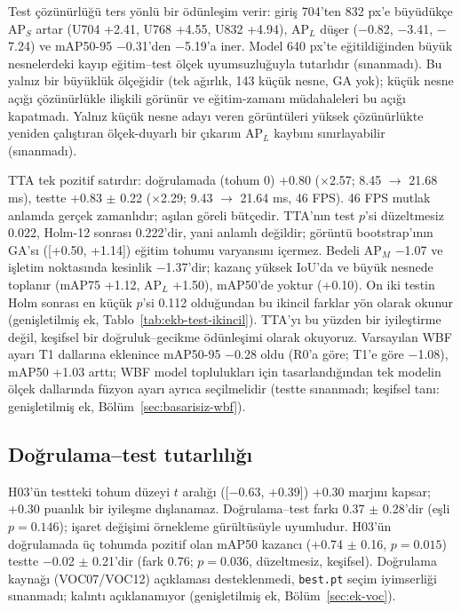 \documentclass[pdflatex,iicol,sn-mathphys-num]{sn-jnl}
\begin{document}
Test çözünürlüğü ters yönlü bir ödünleşim verir: giriş 704'ten 832 px'e büyüdükçe AP$_S$ artar (U704 +2.41, U768 +4.55, U832 +4.94), AP$_L$ düşer ($-$0.82, $-$3.41, $-$7.24) ve mAP50-95 $-$0.31'den $-$5.19'a iner. Model 640 px'te eğitildiğinden büyük nesnelerdeki kayıp eğitim--test ölçek uyumsuzluğuyla tutarlıdır (sınanmadı). Bu yalnız bir büyüklük ölçeğidir (tek ağırlık, 143 küçük nesne, GA yok); küçük nesne açığı çözünürlükle ilişkili görünür ve eğitim-zamanı müdahaleleri bu açığı kapatmadı. Yalnız küçük nesne adayı veren görüntüleri yüksek çözünürlükte yeniden çalıştıran ölçek-duyarlı bir çıkarım AP$_L$ kaybını sınırlayabilir (sınanmadı).

TTA tek pozitif satırdır: doğrulamada (tohum 0) +0.80 ($\times$2.57; 8.45 $\to$ 21.68 ms), testte +0.83 $\pm$ 0.22 ($\times$2.29; 9.43 $\to$ 21.64 ms, 46 FPS). 46 FPS mutlak anlamda gerçek zamanlıdır; aşılan göreli bütçedir. TTA'nın test $p$'si düzeltmesiz 0.022, Holm-12 sonrası 0.222'dir, yani anlamlı değildir; görüntü bootstrap'ının GA'sı ([+0.50, +1.14]) eğitim tohumu varyansını içermez. Bedeli AP$_M$ $-$1.07 ve işletim noktasında kesinlik $-$1.37'dir; kazanç yüksek IoU'da ve büyük nesnede toplanır (mAP75 +1.12, AP$_L$ +1.50), mAP50'de yoktur (+0.10). On iki testin Holm sonrası en küçük $p$'si 0.112 olduğundan bu ikincil farklar yön olarak okunur (genişletilmiş ek, Tablo~\ref{tab:ekb-test-ikincil}). TTA'yı bu yüzden bir iyileştirme değil, keşifsel bir doğruluk--gecikme ödünleşimi olarak okuyoruz. Varsayılan WBF ayarı T1 dallarına eklenince mAP50-95 $-$0.28 oldu (R0'a göre; T1'e göre $-$1.08), mAP50 +1.03 arttı; WBF model toplulukları için tasarlandığından tek modelin ölçek dallarında füzyon ayarı ayrıca seçilmelidir (testte sınanmadı; keşifsel tanı: genişletilmiş ek, Bölüm~\ref{sec:basarisiz-wbf}).

\subsection{Doğrulama--test tutarlılığı}\label{sec:bulgu-tutarlilik}
H03'ün testteki tohum düzeyi $t$ aralığı ([$-$0.63, +0.39]) +0.30 marjını kapsar; +0.30 puanlık bir iyileşme dışlanamaz. Doğrulama--test farkı 0.37 $\pm$ 0.28'dir (eşli $p=0.146$); işaret değişimi örnekleme gürültüsüyle uyumludur. H03'ün doğrulamada üç tohumda pozitif olan mAP50 kazancı (+0.74 $\pm$ 0.16, $p=0.015$) testte $-$0.02 $\pm$ 0.21'dir (fark 0.76; $p=0.036$, düzeltmesiz, keşifsel). Doğrulama kaynağı (VOC07/VOC12) açıklaması desteklenmedi, \texttt{best.pt} seçim iyimserliği sınanmadı; kalıntı açıklanamıyor (genişletilmiş ek, Bölüm~\ref{sec:ek-voc}).
\end{document}
